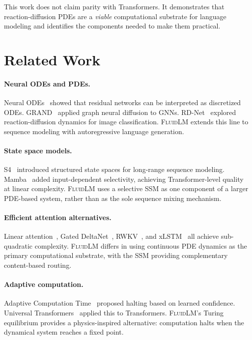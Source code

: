 \documentclass{article}
\newcommand{\fluidlm}{\textsc{FluidLM}}
\begin{document}
This work does not claim parity with Transformers. It demonstrates that reaction-diffusion PDEs are a \emph{viable} computational substrate for language modeling and identifies the components needed to make them practical.

\section{Related Work}
\label{sec:related}

\paragraph{Neural ODEs and PDEs.}
Neural ODEs~\cite{chen2018neural} showed that residual networks can be interpreted as discretized ODEs. GRAND~\cite{chamberlain2021grand} applied graph neural diffusion to GNNs. RD-Net~\cite{wang2023rdnet} explored reaction-diffusion dynamics for image classification. \fluidlm{} extends this line to sequence modeling with autoregressive language generation.

\paragraph{State space models.}
S4~\cite{gu2022efficiently} introduced structured state spaces for long-range sequence modeling. Mamba~\cite{gu2023mamba} added input-dependent selectivity, achieving Transformer-level quality at linear complexity. \fluidlm{} uses a selective SSM as one component of a larger PDE-based system, rather than as the sole sequence mixing mechanism.

\paragraph{Efficient attention alternatives.}
Linear attention~\cite{katharopoulos2020transformers}, Gated DeltaNet~\cite{yang2024gated}, RWKV~\cite{peng2023rwkv}, and xLSTM~\cite{beck2024xlstm} all achieve sub-quadratic complexity. \fluidlm{} differs in using continuous PDE dynamics as the primary computational substrate, with the SSM providing complementary content-based routing.

\paragraph{Adaptive computation.}
Adaptive Computation Time~\cite{graves2016adaptive} proposed halting based on learned confidence. Universal Transformers~\cite{dehghani2019universal} applied this to Transformers. \fluidlm{}'s Turing equilibrium provides a physics-inspired alternative: computation halts when the dynamical system reaches a fixed point.
\end{document}
